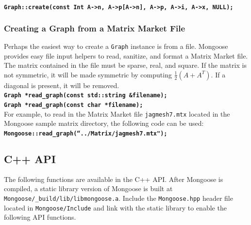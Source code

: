 \documentclass[letter]{article}
\begin{document}
\textbf{\texttt{Graph::create(const Int A->n, A->p[A->n], A->p, A->i, A->x, NULL);}}

\subsubsection{Creating a Graph from a Matrix Market File}

Perhaps the easiest way to create a \texttt{Graph} instance is from a file. Mongoose provides easy file input helpers to read, sanitize, and format a Matrix Market file. The matrix contained in the file must be sparse, real, and square. If the matrix is not symmetric, it will be made symmetric by computing $\frac{1}{2}(A+A^T)$. If a diagonal is present, it will be removed.\\

\textbf{\texttt{Graph *read\_graph(const std::string \&filename);}}\\
\textbf{\texttt{Graph *read\_graph(const char *filename);}}\\

For example, to read in the Matrix Market file \texttt{jagmesh7.mtx} located in the Mongoose sample matrix directory, the following code can be used:\\

\textbf{\texttt{Mongoose::read\_graph(``../Matrix/jagmesh7.mtx");}}

\subsection{C++ API}

The following functions are available in the C++ API. After Mongoose is compiled, a static library version of Mongoose is built at \texttt{Mongoose/\_build/lib/libmongoose.a}. Include the \texttt{Mongoose.hpp} header file located in \texttt{Mongoose/Include} and link with the static library to enable the following API functions.
\end{document}
